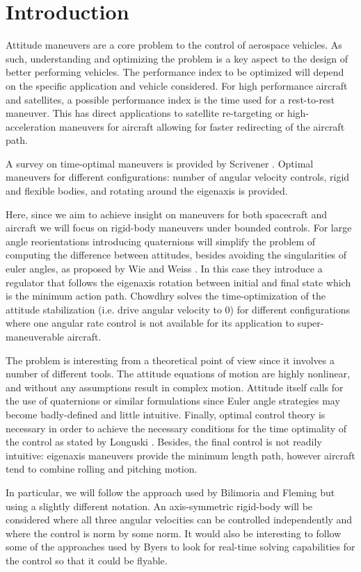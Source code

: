 \section{Introduction}
Attitude maneuvers are a core problem to the control of aerospace vehicles. As such, understanding and optimizing the problem is a key aspect to the design of better performing vehicles. The performance index to be optimized will depend on the specific application and vehicle considered. For high performance aircraft and satellites, a possible performance index is the time used for a rest-to-rest maneuver. This has direct applications to satellite re-targeting or high-acceleration maneuvers for aircraft allowing for faster redirecting of the aircraft path. 

A survey on time-optimal maneuvers is provided by Scrivener \cite{scrivener1994survey}. Optimal maneuvers for different configurations: number of angular velocity controls, rigid and flexible bodies, and rotating around the eigenaxis is provided.

Here, since we aim to achieve insight on maneuvers for both spacecraft and aircraft we will focus on rigid-body maneuvers under bounded controls. For large angle reorientations introducing quaternions will simplify the problem of computing the difference between attitudes, besides avoiding the singularities of euler angles, as proposed by Wie and Weiss \cite{wie1989quaternion}. In this case they introduce a regulator that follows the eigenaxis rotation between initial and final state which is the minimum action path. Chowdhry \cite{chowdhry1991optimal} solves the time-optimization of the attitude stabilization (i.e. drive angular velocity to 0) for different configurations where one angular rate control is not available for its application to super-maneuverable aircraft.

The problem is interesting from a theoretical point of view since it involves a number of different tools. The attitude equations of motion are highly nonlinear, and without any assumptions result in complex motion. Attitude itself calls for the use of quaternions or similar formulations since Euler angle strategies may become badly-defined and little intuitive. Finally, optimal control theory is necessary in order to achieve the necessary conditions for the time optimality of the control as stated by Longuski \cite{longuski2014optimal}. Besides, the final control is not readily intuitive: eigenaxis maneuvers provide the minimum length path, however aircraft tend to combine rolling and pitching motion.

In particular, we will follow the approach used by Bilimoria \cite{bilimoria1993time} and Fleming \cite{fleming2010minimum} but using a slightly different notation. An axis-symmetric rigid-body will be considered where all three angular velocities can be controlled independently and where the control is norm by some norm. It would also be interesting to follow some of the approaches used by Byers \cite{byers1993quasi} to look for real-time solving capabilities for the control so that it could be flyable.


